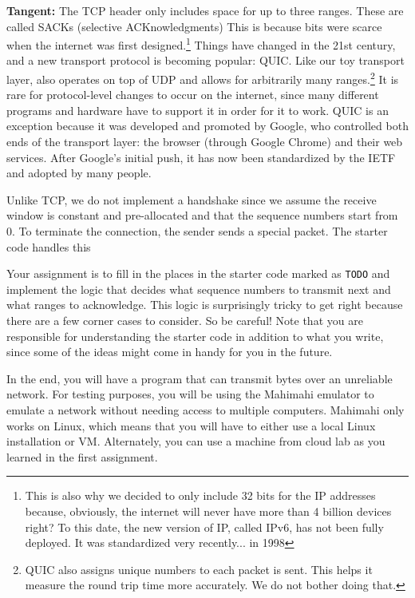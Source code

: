 \documentclass{article}
\begin{document}
\noindent\textbf{Tangent:} The TCP header only includes space for up to three ranges. These are called SACKs (selective ACKnowledgments) This is because bits were scarce when the internet was first designed.\footnote{This is also why we decided to only include 32 bits for the IP addresses because, obviously, the internet will never have more than 4 billion devices right? To this date, the new version of IP, called IPv6, has not been fully deployed. It was standardized very recently... in 1998} Things have changed in the 21st century, and a new transport protocol is becoming popular: QUIC. Like our toy transport layer, also operates on top of UDP and allows for arbitrarily many ranges.\footnote{QUIC also assigns unique numbers to each packet is sent. This helps it measure the round trip time more accurately. We do not bother doing that.} It is rare for protocol-level changes to occur on the internet, since many different programs and hardware have to support it in order for it to work. QUIC is an exception because it was developed and promoted by Google, who controlled both ends of the transport layer: the browser (through Google Chrome) and their web services. After Google's initial push, it has now been standardized by the IETF and adopted by many people.

Unlike TCP, we do not implement a handshake since we assume the receive window is constant and pre-allocated and that the sequence numbers start from 0. To terminate the connection, the sender sends a special packet. The starter code handles this

Your assignment is to fill in the places in the starter code marked as {\tt TODO} and implement the logic that decides what sequence numbers to transmit next and what ranges to acknowledge. This logic is surprisingly tricky to get right because there are a few corner cases to consider. So be careful! Note that you are responsible for understanding the starter code in addition to what you write, since some of the ideas might come in handy for you in the future.

In the end, you will have a program that can transmit bytes over an unreliable network. For testing purposes, you will be using the Mahimahi emulator to emulate a network without needing access to multiple computers. Mahimahi only works on Linux, which means that you will have to either use a local Linux installation or VM. Alternately, you can use a machine from cloud lab as you learned in the first assignment.

\begin{comment}
  Assignment plan
  - 1 Connect to cloud lab. Use netcat to connect to example.com and download the HTML. Do the same by using python sockets. Using sockets, create a very very simple python web server that compares input to a given string and response
  - 2 Create a transport layer that uses UDP to send packets
  - 3 Implement a routing algorithm
  - 4 Play with wireshark. Inspect ARP packets, TCP packets, and try to follow HTTP connections. See what others in your wifi network are using. Can you read their private messages? Why not?
  - 5 Secure communication over the internet
\end{comment}
\end{document}
